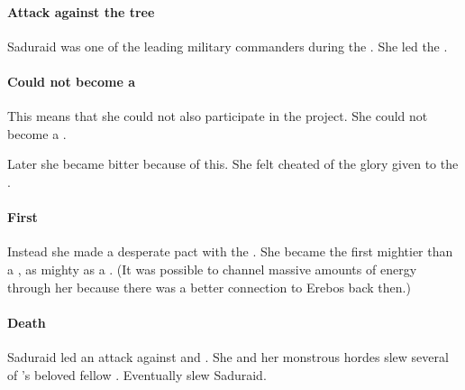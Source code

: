 \subsubsection{Attack against the tree}
Saduraid was one of the leading military commanders during the . 
She led the . 





\subsubsection{Could not become a \sathariah}
This means that she could not also participate in the \sathariah project. 
She could not become a \sathariah.

Later she became bitter because of this.
She felt cheated of the glory given to the \satharioth. 





\subsubsection{First \neoresphan}
Instead she made a desperate pact with the \banes.
She became the first \dash mightier than a \sathariah, as mighty as a \dragon.
(It was possible to channel massive amounts of \bane energy through her because there was a better connection to Erebos back then.) 





\subsubsection{Death}
Saduraid led an attack against \Secherdamon and . 
She and her monstrous hordes slew several of \Secherdamon's beloved fellow \dragons.
Eventually \Secherdamon slew Saduraid. 






















\chapter{\TiphredSerah}















